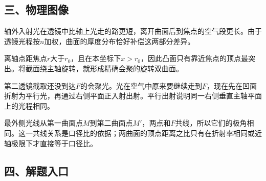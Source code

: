 \documentclass[12pt,a4paper,fontset=fandol]{ctexart}
\begin{document}
\subsection{三、物理图像}\label{ux4e09ux7269ux7406ux56feux50cf}

轴外入射光在透镜中比轴上光走的路更短，离开曲面后到焦点的空气段更长。由于透镜光程按\(n\)加权，曲面的厚度分布恰好补偿这两部分差异。

离轴点距焦点\(r\)大于\(r_0\)，且在本坐标下\(x>r_0\)，因此凸面只有靠近焦点的顶点最突出。将截面绕主轴旋转，就形成精确会聚的旋转双曲面。

\begin{center}
\begin{minipage}{\linewidth}
\centering\begingroup{}
\ifdim\wd\diagrambox>.88\linewidth
\sbox{\diagrambox}{\resizebox{.88\linewidth}{!}{\usebox{\diagrambox}}}\fi
\ifdim\ht\diagrambox>.38\textheight
\resizebox{!}{.38\textheight}{\usebox{\diagrambox}}
\else\usebox{\diagrambox}\fi
\par{}\endgroup\end{minipage}\end{center}

第二透镜截取还没到达\(F\)的会聚光。光在空气中原来要继续走到\(F\)，现在先在凹面折射为平行光，再通过右侧平面正入射出射。平行出射说明同一右侧垂直主轴平面上的光程相同。

最外侧光线从第一曲面点\(M\)到第二曲面点\(M'\)，两点和\(F\)共线，所以它们的极角相同。这一共线关系是口径比的依据；两曲面的顶点距离之比只有在折射率相同或近轴极限下才直接等于口径比。

\subsection{四、解题入口}\label{ux56dbux89e3ux9898ux5165ux53e3}
\end{document}
